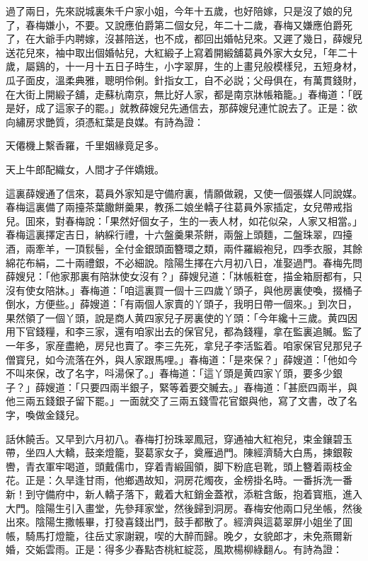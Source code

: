 過了兩日，先來説城裏朱千户家小姐，今年十五歲，也好陪嫁，只是沒了娘的兒了，春梅嫌小，不要。又說應伯爵第二個女兒，年二十二歲，春梅又嫌應伯爵死了，在大爺手内聘嫁，沒甚陪送，也不成，都回出婚帖兒來。又遲了幾日，薛嫂兒送花兒來，袖中取出個婚帖兒，大紅緞子上寫着開緞舖葛員外家大女兒，「年二十歲，屬鷄的，十一月十五日子時生，小字翠屏，生的上畫兒般模樣兒，五短身材，瓜子面皮，溫柔典雅，聰明伶俐。針指女工，自不必説；父母俱在，有萬貫錢財，在大街上開緞子舖，走蘇杭南京，無比好人家，都是南京牀帳箱籠。」春梅道：「旣是好，成了這家子的罷。」就教薛嫂兒先通信去，那薛嫂兒連忙說去了。正是：欲向繡房求艷質，須憑紅葉是良媒。有詩為證：

\begin{myquote}
天僊機上繫香羅，千里姻緣竟足多。

天上牛郎配織女，人間才子伴嬌娥。
\end{myquote}

這裏薛嫂通了信來，葛員外家知是守備府裏，情願做親，又使一個張媒人同說媒。春梅這裏備了兩擡茶葉饊餅羹果，教孫二娘坐轎子往葛員外家插定，女兒帶戒指兒。囬來，對春梅說：「果然好個女子，生的一表人材，如花似朶，人家又相當。」春梅這裏擇定吉日，納綵行禮，十六盤羹果茶餅，兩盤上頭麵，二盤珠翠，四擡酒，兩牽羊，一頂䯼髻，全付金銀頭面簪環之類，兩件羅緞袍兒，四季衣服，其餘綿花布絹，二十兩禮銀，不必細說。陰陽生擇在六月初八日，准娶過門。春梅先問薛嫂兒：「他家那裏有陪牀使女沒有？」薛嫂兒道：「牀帳粧奩，描金箱厨都有，只沒有使女陪牀。」春梅道：「咱這裏買一個十三四歲丫頭子，與他房裏使喚，掇桶子倒水，方便些。」薛嫂道：「有兩個人家賣的丫頭子，我明日帶一個來。」到次日，果然領了一個丫頭，說是商人黄四家兒子房裏使的丫頭：「今年纔十三歲。黄四因用下官錢糧，和李三家，還有咱家出去的保官兒，都為錢糧，拿在監裏追贓。監了一年多，家産盡絶，房兒也賣了。李三先死，拿兒子李活監着。咱家保官兒那兒子僧寳兒，如今流落在外，與人家跟馬哩。」春梅道：「是來保？」薛嫂道：「他如今不叫來保，改了名字，呌湯保了。」春梅道：「這丫頭是黄四家丫頭，要多少銀子？」薛嫂道：「只要四兩半銀子，緊等着要交贓去。」春梅道：「甚麽四兩半，與他三兩五錢銀子留下罷。」一面就交了三兩五錢雪花官銀與他，寫了文書，改了名字，喚做金錢兒。

話休饒舌。又早到六月初八。春梅打扮珠翠鳳冠，穿通袖大紅袍兒，束金鑲碧玉帶，坐四人大轎，鼓楽燈籠，娶葛家女子，奠雁過門。陳經濟騎大白馬，揀銀鞍轡，青衣軍牢喝道，頭戴儒巾，穿着青緞圓領，脚下粉底皂靴，頭上簪着兩枝金花。正是：久旱逢甘雨，他鄉遇故知，洞房花燭夜，金榜掛名時。一番拆洗一番新！到守備府中，新人轎子落下，戴着大紅銷金蓋袱，添粧含飯，抱着寳瓶，進入大門。陰陽生引入畫堂，先參拜家堂，然後歸到洞房。春梅安他兩口兒坐帳，然後出來。陰陽生撒帳畢，打發喜錢出門，鼓手都散了。經濟與這葛翠屏小姐坐了囬帳，騎馬打燈籠，往岳丈家謝親，喫的大醉而歸。晚夕，女貌郎才，未免燕爾新婚，交姤雲雨。正是：得多少春點杏桃紅綻蕊，風欺楊柳綠翻ん。有詩為證：

